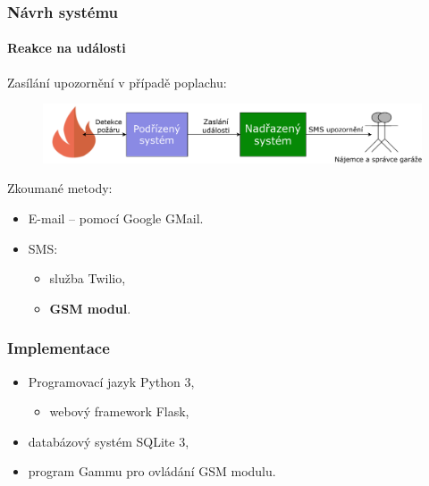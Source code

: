 \documentclass{beamer}
\begin{document}
  \begin{frame}
    \frametitle{Návrh systému}
    \framesubtitle{Reakce na události}

    Zasílání upozornění v případě poplachu:

    \begin{figure}
        \includegraphics[scale=0.45]{../images/alert.pdf}
    \end{figure}

    Zkoumané metody:

    \begin{itemize}
      \item E-mail -- pomocí Google GMail.
      \item SMS:
      \begin{itemize}
        \item služba Twilio,
        \item \textbf{GSM modul}. 
      \end{itemize}
    \end{itemize}


  \end{frame}

  \begin{frame}
    \frametitle{Implementace}

    \begin{itemize}
      \item Programovací jazyk Python 3,
      \begin{itemize}
        \item webový framework Flask,
      \end{itemize}
      \item databázový systém SQLite 3,
      \item program Gammu pro ovládání GSM modulu.
    \end{itemize}


  \end{frame}
\end{document}
